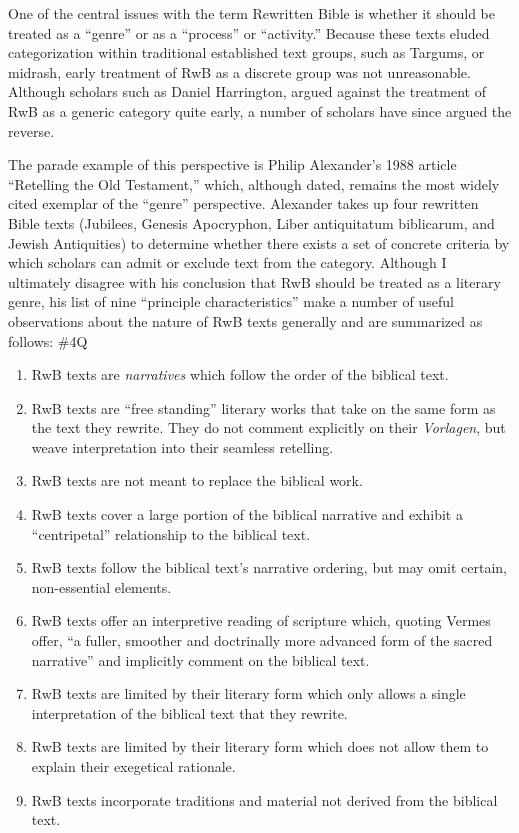 One of the central issues with the term Rewritten Bible is whether it
should be treated as a ``genre'' or as a ``process'' or ``activity.''
Because these texts eluded categorization within traditional established
text groups, such as Targums, or midrash, early treatment of RwB as a
discrete group was not unreasonable. Although scholars such as Daniel
Harrington, argued against the treatment of RwB as a generic category
quite early,\autocite{harrington_kraft-nickelsburg1986} a number of
scholars have since argued the reverse.

The parade example of this perspective is Philip Alexander's 1988
article ``Retelling the Old Testament,'' which, although dated, remains
the most widely cited exemplar of the ``genre''
perspective.\autocite{alexander_carson-williamson1988} Alexander takes
up four rewritten Bible texts (Jubilees, Genesis Apocryphon,
Liber antiquitatum biblicarum, and Jewish Antiquities) to determine
whether there exists a set of concrete criteria by which scholars can
admit or exclude text from the category. Although I ultimately disagree
with his conclusion that RwB should be treated as a literary genre, his
list of nine ``principle characteristics'' make a number of useful
observations about the nature of RwB texts generally and are summarized
as follows: \#4Q

\begin{enumerate}
\def\labelenumi{\arabic{enumi}.}
\tightlist
\item
  RwB texts are \emph{narratives} which follow the order of the biblical
  text.
\item
  RwB texts are ``free standing'' literary works that take on the same
  form as the text they rewrite. They do not comment explicitly on their
  \emph{Vorlagen}, but weave interpretation into their seamless
  retelling.
\item
  RwB texts are not meant to replace the biblical work.
\item
  RwB texts cover a large portion of the biblical narrative and exhibit
  a ``centripetal'' relationship to the biblical text.
\item
  RwB texts follow the biblical text's narrative ordering, but may omit
  certain, non-essential elements.
\item
  RwB texts offer an interpretive reading of scripture which, quoting
  Vermes offer, ``a fuller, smoother and doctrinally more advanced form
  of the sacred narrative''\autocite[Citing Vermes in][305]{schurer1986}
  and implicitly comment on the biblical text.
\item
  RwB texts are limited by their literary form which only allows a
  single interpretation of the biblical text that they rewrite.
\item
  RwB texts are limited by their literary form which does not allow them
  to explain their exegetical rationale.
\item
  RwB texts incorporate traditions and material not derived from the
  biblical text.
\end{enumerate}

